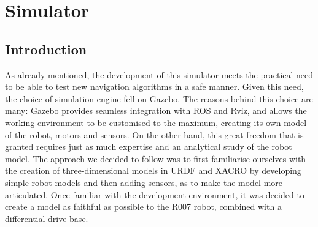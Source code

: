 \section{Simulator}
\label{section:sim}
\subsection{Introduction}
As already mentioned, the development of this simulator meets the practical need to be able to test new navigation algorithms in a safe manner. Given this need, the choice of simulation engine fell on Gazebo. The reasons behind this choice are many: Gazebo provides seamless integration with ROS and Rviz, and allows the working environment to be customised to the maximum, creating its own model of the robot, motors and sensors. On the other hand, this great freedom that is granted requires just as much expertise and an analytical study of the robot model. The approach we decided to follow was to first familiarise ourselves with the creation of three-dimensional models in URDF and XACRO by developing simple robot models and then adding sensors, as to make the model more articulated. Once familiar with the development environment, it was decided to create a model as faithful as possible to the R007 robot, combined with a differential drive base. 
